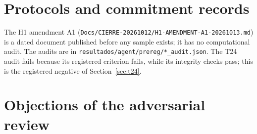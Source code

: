 \documentclass[11pt,a4paper]{article}
\begin{document}
\FloatBarrier
\section{Protocols and commitment records}
\label{app:protocols}



\noindent The H1 amendment A1 (\texttt{Docs/CIERRE-20261012/H1-AMENDMENT-A1-20261013.md}) is a dated document published before any sample exists; it has no computational audit. The audits are in \texttt{resultados/agent/prereg/*\_audit.json}. The T24 audit fails because its registered criterion fails, while its integrity checks pass; this is the registered negative of Section~\ref{sec:t24}.

\clearpage
\section{Objections of the adversarial review}
\label{app:review}
\end{document}
